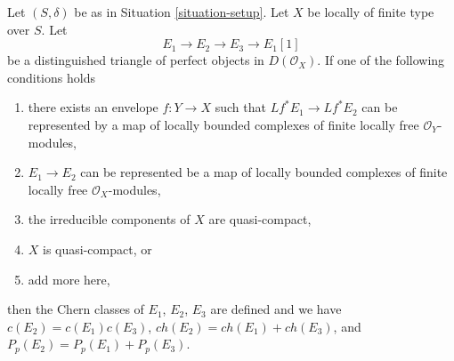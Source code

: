 \begin{lemma}
\label{lemma-additivity-on-perfect}
Let $(S, \delta)$ be as in Situation \ref{situation-setup}.
Let $X$ be locally of finite type over $S$. Let
$$
E_1 \to E_2 \to E_3 \to E_1[1]
$$
be a distinguished triangle of perfect objects in $D(\mathcal{O}_X)$.
If one of the following conditions holds
\begin{enumerate}
\item there exists an envelope $f : Y \to X$ such that
$Lf^*E_1 \to Lf^*E_2$ can be represented by a map of locally
bounded complexes of finite locally free $\mathcal{O}_Y$-modules,
\item $E_1 \to E_2$ can be represented be a map of locally bounded complexes
of finite locally free $\mathcal{O}_X$-modules,
\item the irreducible components of $X$ are quasi-compact,
\item $X$ is quasi-compact, or
\item add more here,
\end{enumerate}
then the Chern classes of $E_1$, $E_2$, $E_3$ are defined and we have
$c(E_2) = c(E_1) c(E_3)$, $ch(E_2) = ch(E_1) + ch(E_3)$, and
$P_p(E_2) = P_p(E_1) + P_p(E_3)$.
\end{lemma}

